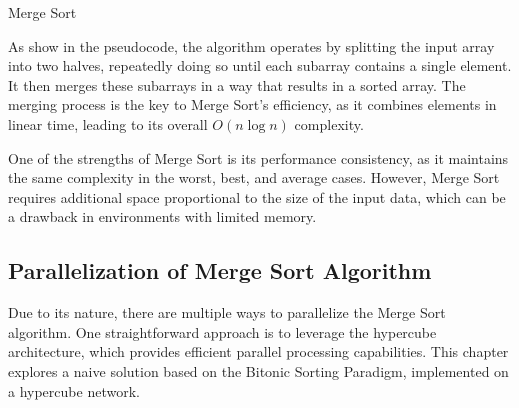 \documentclass[article,12pt,conference]{ieeeconf} %
\begin{document}
\begin{algorithm}[h]
\vspace{0.5em}
\caption{Merge Sort}
\vspace{0.25em}
\SetAlgoLined
{}

\vspace{0.5em}
\end{algorithm}
As show in the pseudocode, the algorithm operates by splitting the input array into two halves, repeatedly doing so until each subarray contains a single element. It then merges these subarrays in a way that results in a sorted array. The merging process is the key to Merge Sort's efficiency, as it combines elements in linear time, leading to its overall $O(n\log n)$ complexity.\par
One of the strengths of Merge Sort is its performance consistency, as it maintains the same complexity in the worst, best, and average cases. However, Merge Sort requires additional space proportional to the size of the input data, which can be a drawback in environments with limited memory.

\subsection{Parallelization of Merge Sort Algorithm}
Due to its nature, there are multiple ways to parallelize the Merge Sort algorithm. One straightforward approach is to leverage the hypercube architecture, which provides efficient parallel processing capabilities. This chapter explores a naive solution based on the Bitonic Sorting Paradigm, implemented on a hypercube network.
\end{document}
